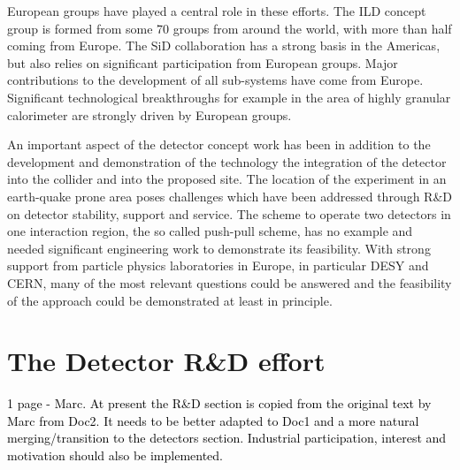\documentclass[%
 reprint,
 amsmath,amssymb,
 aps,
]{revtex4-1}
\newcommand{\todo}[1]{\textcolor{black}{{#1}}}
\begin{document}
European groups have played a central role in these efforts. The ILD concept group is formed from some 70 groups from around the world, with more than half coming from Europe. The SiD collaboration has a strong basis in the Americas, but also relies on significant participation from European groups. Major contributions to the development of all sub-systems have come from Europe. Significant technological breakthroughs for example in the area of highly granular calorimeter are strongly driven by European groups. 

An important aspect of the detector concept work has been in addition to the development and demonstration of the technology the integration of the detector into the collider and into the proposed site. The location of the experiment in an earth-quake prone area poses challenges which have been addressed through R\&D on detector stability, support and service. The scheme to operate two detectors in one interaction region, the so called push-pull scheme, has no example and needed significant engineering work to demonstrate its feasibility. With strong support from particle physics laboratories in Europe, in  particular DESY and CERN, many of the most relevant questions could be answered and the feasibility of the approach could be demonstrated at least in principle. 




\section{\label{sec:detectrd} The Detector R\&D effort}


\todo{ 1 page - Marc.}
\todo{At present the R\&D section is copied from the original text by  Marc from Doc2. It needs to be better adapted to Doc1 and a more natural merging/transition to the detectors section. Industrial participation, interest and motivation should also be implemented.}
\end{document}
